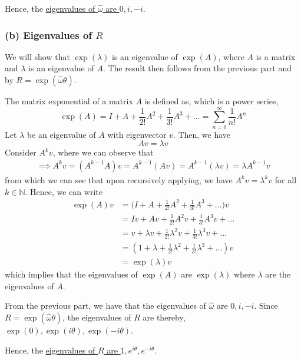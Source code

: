 Hence, the \underline{eigenvalues of \( \hat{\omega} \) are \( 0, i, -i \)}.

\subsubsection*{(b) Eigenvalues of \( R \)}

We will show that \( \exp(\lambda) \) is an eigenvalue of \( \exp(A) \), where \( A \) is a matrix and \( \lambda \) is an eigenvalue of \( A \).
The result then follows from the previous part and by \( R = \exp(\hat{\omega} \theta) \).

The matrix exponential of a matrix \( A \) is defined as, which is a power series,
\[
    \exp(A)
    = I + A + \frac{1}{2!} A^{2} + \frac{1}{3!} A^{3} + \ldots
    = \sum_{n=0}^{\infty} \frac{1}{n!} A^{n}
\]
Let \( \lambda \) be an eigenvalue of \( A \) with eigenvector \( v \).
Then, we have
\[
    A v = \lambda v
\]
Consider \( A^k v \), where we can observe that
\begin{align*}
    \implies
    A^k v
    =
    (A^{k-1} A) v
    =
    A^{k-1}(A v) = A^{k-1} (\lambda v)
    =
    \lambda A^{k-1} v
\end{align*}
from which we can see that upon recursively applying, we have \( A^k v = \lambda^k v \) for all \( k \in \mathbb{N} \).
Hence, we can write
\begin{align*}
    \exp(A) v
     & = \Big(I + A + \frac{1}{2!} A^{2} + \frac{1}{3!} A^{3} + \ldots\Big) v
    \\ & =
    I v + A v + \frac{1}{2!} A^{2} v + \frac{1}{3!} A^{3} v + \ldots
    \\ & =
    v + \lambda v + \frac{1}{2!} \lambda^{2} v + \frac{1}{3!} \lambda^{3} v + \ldots
    \\ & =
    (1 + \lambda + \frac{1}{2!} \lambda^{2} + \frac{1}{3!} \lambda^{3} + \ldots) v
    \\ & =
    \exp(\lambda) v
\end{align*}
which implies that the eigenvalues of \( \exp(A) \) are \( \exp(\lambda) \) where \( \lambda \) are the eigenvalues of \( A \).

From the previous part, we have that the eigenvalues of \( \hat{\omega} \) are \( 0, i, -i \).
Since \( R = \exp(\hat{\omega} \theta) \), the eigenvalues of \( R \) are thereby, \( \exp(0), \exp(i \theta), \exp(-i \theta) \).

Hence, the \underline{eigenvalues of \( R \) are \( 1, e^{i \theta}, e^{-i \theta} \)}.
